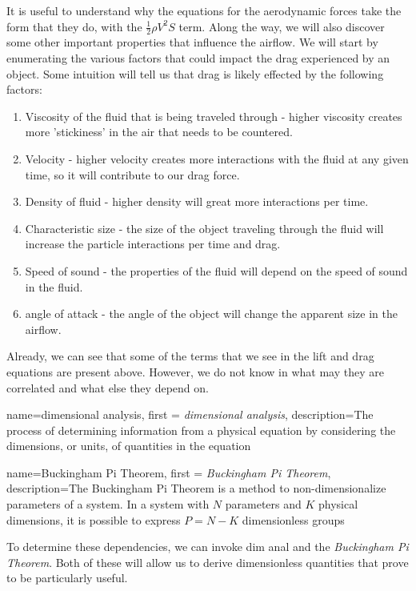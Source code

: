 \documentclass[12pt]{report}
\begin{document}
It is useful to understand why the equations for the aerodynamic forces take the form that they do, with the $\frac{1}{2}\rho V^2S$ term. Along the way, we will also discover some other important properties that influence the airflow. We will start by enumerating the various factors that could impact the drag experienced by an object. Some intuition will tell us that drag is likely effected by the following factors:
\begin{enumerate}
    \item Viscosity of the fluid that is being traveled through - higher viscosity creates more 'stickiness' in the air that needs to be countered.
    \item Velocity - higher velocity creates more interactions with the fluid at any given time, so it will contribute to our drag force.
    \item Density of fluid - higher density will great more interactions per time.
    \item Characteristic size - the size of the object traveling through the fluid will increase the particle interactions per time and drag.
    \item Speed of sound - the properties of the fluid will depend on the speed of sound in the fluid.
    \item \Gls{angle of attack} - the angle of the object will change the apparent size in the airflow.
\end{enumerate}
Already, we can see that some of the terms that we see in the lift and drag equations are present above. However, we do not know in what may they are correlated and what else they depend on.

{
    name=dimensional analysis,
    first = {\textit{dimensional analysis}},
    description={The process of determining information from a physical equation by considering the dimensions, or units, of quantities in the equation}
}

{
    name=Buckingham Pi Theorem,
    first = {\textit{Buckingham Pi Theorem}},
    description={The Buckingham Pi Theorem is a method to non-dimensionalize parameters of a system. In a system with $N$ parameters and $K$ physical dimensions, it is possible to express $P=N-K$ dimensionless groups}
}

To determine these dependencies, we can invoke \gls{dim anal} and the \textit{Buckingham Pi Theorem}. Both of these will allow us to derive dimensionless quantities that prove to be particularly useful.
\end{document}
